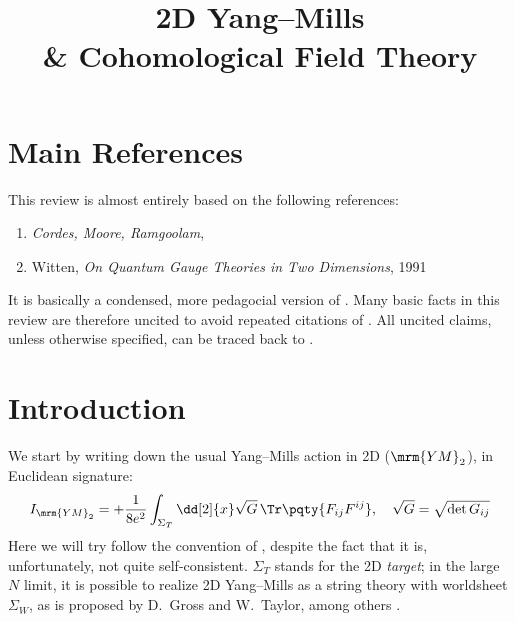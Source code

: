 \documentclass[a4paper
	,10pt
]{article}
\title{2D Yang--Mills \\ \& Cohomological Field Theory}
\newcommand{\YM}{{\ensuremath{\mrm{YM}_2}}\xspace}
\begin{document}
\maketitle
{}
\thispagestyle{empty}


\setlength{\parskip}{.1\baselineskip}
\tableofcontents
\setlength{\parskip}{\parskipnorm}

\addtocounter{section}{-1}
\section{Main References}
	This review is almost entirely based on the following references:
	\begin{enumerate}[
		noitemsep
		,labelindent=\parindent
		,align=left
		,leftmargin=*
	]
	\item[\cite{Cordes:1994fc}] \textit{Cordes, Moore, Ramgoolam}, 
	\item[\cite{Witten:1991we}] Witten, \textit{On Quantum Gauge Theories in Two Dimensions}, 1991
	\end{enumerate}
	It is basically a condensed, more pedagocial version of \cite{Cordes:1994fc}. Many basic facts in this review are therefore uncited to avoid repeated citations of \cite{Cordes:1994fc}. All uncited claims, unless otherwise specified, can be traced back to \cite{Cordes:1994fc}. 
\section{Introduction}
	We start by writing down the usual Yang--Mills action in 2D (\YM), in Euclidean signature:
	\begin{equation}
		I_{\YM}
		= +\frac{1}{8e^2}
			\int_{\Sigma_T} \dd[2]{x}
			\sqrt{G}
			\,\Tr \pqty{F_{ij} F^{ij}},
	\quad
		\sqrt{G} = \sqrt{\det G_{ij}}
	\end{equation}
	Here we will try follow the convention of \cite{Cordes:1994fc}, despite the fact that it is, unfortunately, not quite self-consistent. $\Sigma_T$ stands for the 2D \textit{target};  in the large $N$ limit, it is possible to realize 2D Yang--Mills as a string theory with worldsheet $\Sigma_W$, as is proposed by D.~Gross and W.~Taylor, among others \cite{Gross:1992tu,Gross:1993hu,Gross:1993yt}. 
	
\end{document}
